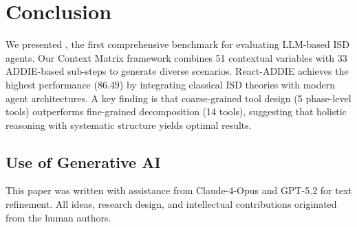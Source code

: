 \section{Conclusion}
\label{sec:conclusion}

We presented \benchmark{}, the first comprehensive benchmark for evaluating LLM-based ISD agents. Our Context Matrix framework combines 51 contextual variables with 33 ADDIE-based sub-steps to generate \numscenarios{} diverse scenarios. React-ADDIE achieves the highest performance (86.49) by integrating classical ISD theories with modern agent architectures. A key finding is that coarse-grained tool design (5 phase-level tools) outperforms fine-grained decomposition (14 tools), suggesting that holistic reasoning with systematic structure yields optimal results.

\subsection{Use of Generative AI}

This paper was written with assistance from Claude-4-Opus and GPT-5.2 for text refinement. All ideas, research design, and intellectual contributions originated from the human authors.

